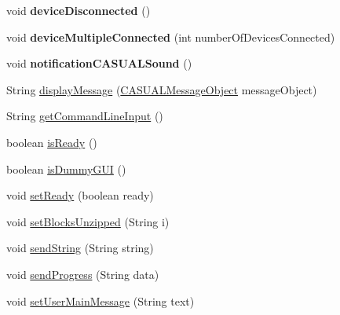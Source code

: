 \begin{DoxyCompactItemize}
\item 
\hypertarget{class_g_u_i_1_1development_1_1_c_a_s_u_a_l_g_u_i_main_abc765ffda03eaac0eec791733f976e70}{void {\bfseries device\-Disconnected} ()}\label{class_g_u_i_1_1development_1_1_c_a_s_u_a_l_g_u_i_main_abc765ffda03eaac0eec791733f976e70}

\item 
\hypertarget{class_g_u_i_1_1development_1_1_c_a_s_u_a_l_g_u_i_main_a83da1674b620a7e018592ff276e29ff9}{void {\bfseries device\-Multiple\-Connected} (int number\-Of\-Devices\-Connected)}\label{class_g_u_i_1_1development_1_1_c_a_s_u_a_l_g_u_i_main_a83da1674b620a7e018592ff276e29ff9}

\item 
\hypertarget{class_g_u_i_1_1development_1_1_c_a_s_u_a_l_g_u_i_main_af728a9ace9c9d442d703cab0e9db2b7f}{void {\bfseries notification\-C\-A\-S\-U\-A\-L\-Sound} ()}\label{class_g_u_i_1_1development_1_1_c_a_s_u_a_l_g_u_i_main_af728a9ace9c9d442d703cab0e9db2b7f}

\item 
String \hyperlink{class_g_u_i_1_1development_1_1_c_a_s_u_a_l_g_u_i_main_a9a613331ac8043d579fff7c31e29c17d}{display\-Message} (\hyperlink{class_c_a_s_u_a_l_1_1_c_a_s_u_a_l_message_object}{C\-A\-S\-U\-A\-L\-Message\-Object} message\-Object)
\item 
String \hyperlink{class_g_u_i_1_1development_1_1_c_a_s_u_a_l_g_u_i_main_af435dc7d2ccc8cca299f03e5d04c79b8}{get\-Command\-Line\-Input} ()
\item 
boolean \hyperlink{class_g_u_i_1_1development_1_1_c_a_s_u_a_l_g_u_i_main_a1309b5c1bd0cebf65515d0c089627c4e}{is\-Ready} ()
\item 
boolean \hyperlink{class_g_u_i_1_1development_1_1_c_a_s_u_a_l_g_u_i_main_a81d97bc67cb2ff55eaa07d1e871704dd}{is\-Dummy\-G\-U\-I} ()
\item 
void \hyperlink{class_g_u_i_1_1development_1_1_c_a_s_u_a_l_g_u_i_main_a62b7a1d1bd8ea87c4a7e25f640473885}{set\-Ready} (boolean ready)
\item 
void \hyperlink{class_g_u_i_1_1development_1_1_c_a_s_u_a_l_g_u_i_main_a7c7021e46586c92c30c7b65b0d69bb1f}{set\-Blocks\-Unzipped} (String i)
\item 
void \hyperlink{class_g_u_i_1_1development_1_1_c_a_s_u_a_l_g_u_i_main_a2c1916fe71c5f2b99f55ce201eb56793}{send\-String} (String string)
\item 
void \hyperlink{class_g_u_i_1_1development_1_1_c_a_s_u_a_l_g_u_i_main_ab7f5af9a20dc226fe30272669c4006b6}{send\-Progress} (String data)
\item 
void \hyperlink{class_g_u_i_1_1development_1_1_c_a_s_u_a_l_g_u_i_main_a2a62b2c8d83a4fbc3e037566a75b069f}{set\-User\-Main\-Message} (String text)
\end{DoxyCompactItemize}
